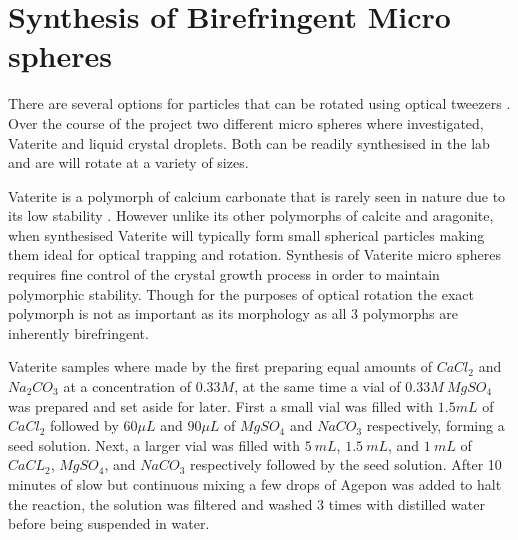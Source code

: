 \section{Synthesis of Birefringent Micro spheres}
\label{sec:vaterite}
There are several options for particles that can be rotated using optical 
tweezers \cite{Parkin2009, Saito2022}. Over the course of the project two 
different micro spheres where investigated, Vaterite and liquid crystal 
droplets. Both can be readily synthesised in the lab and are will rotate 
at a variety of sizes.

Vaterite is a polymorph of calcium carbonate that is rarely seen in nature 
due to its low stability \cite{KonopackaLyskawa2019}. However unlike its 
other polymorphs of calcite and aragonite, when synthesised Vaterite will 
typically form small spherical particles making them ideal for optical 
trapping and rotation. Synthesis of Vaterite micro spheres requires fine 
control of the crystal growth process in order to maintain polymorphic stability. 
Though for the purposes of optical rotation the exact polymorph is not as 
important as its morphology as all 3 polymorphs are inherently birefringent. 

Vaterite samples where made by the first preparing equal amounts of 
$CaCl_2$ and $Na_2CO_3$ at a concentration of $0.33M$, at the same time
a vial of $0.33M\ MgSO_4$ was prepared and set aside for later. First
a small vial was filled with $1.5mL$ of $CaCl_2$ followed by $60\mu L$ 
and $90\mu L$ of $MgSO_4$ and $NaCO_3$ respectively, forming a seed solution. 
Next, a larger vial was filled with $5\ mL$, $1.5\ mL$, and $1\ mL$ of
$CaCL_2$, $MgSO_4$, and $NaCO_3$ respectively followed by the seed solution. 
After 10 minutes of slow but continuous mixing a few drops of Agepon was added
to halt the reaction, the solution was filtered and washed 3 times with 
distilled water before being suspended in water.
 
